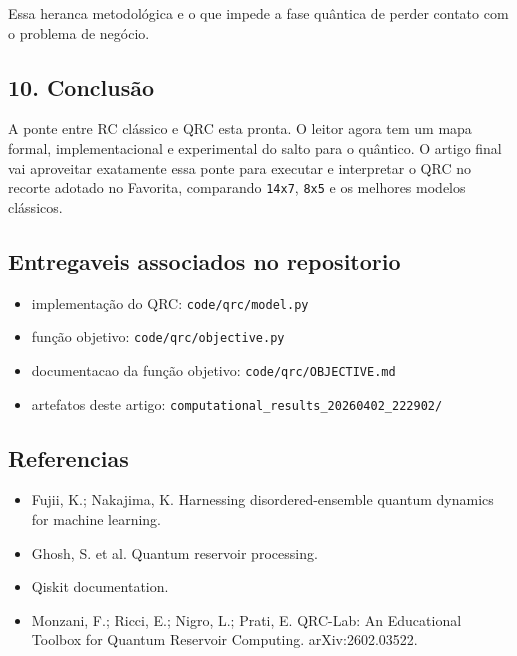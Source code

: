 \documentclass[12pt]{article}
\providecommand{\tightlist}{%
          \setlength{\itemsep}{0pt}\setlength{\parskip}{0pt}}
\begin{document}
Essa heranca metodológica e o que impede a fase quântica de perder contato com o problema de negócio.

\subsection{10. Conclusão}\label{10-conclusuxe3o}

A ponte entre RC clássico e QRC esta pronta. O leitor agora tem um mapa formal, implementacional e experimental do salto para o quântico. O artigo final vai aproveitar exatamente essa ponte para executar e interpretar o QRC no recorte adotado no Favorita, comparando \texttt{14x7}, \texttt{8x5} e os melhores modelos clássicos.

\subsection{Entregaveis associados no repositorio}\label{entregaveis-associados-no-repositorio}

\begin{itemize}
\tightlist
\item
  implementação do QRC: \texttt{code/qrc/model.py}
\item
  função objetivo: \texttt{code/qrc/objective.py}
\item
  documentacao da função objetivo: \texttt{code/qrc/OBJECTIVE.md}
\item
  artefatos deste artigo: \texttt{computational\_results\_20260402\_222902/}
\end{itemize}

\subsection{Referencias}\label{referencias}

\begin{itemize}
\tightlist
\item
  Fujii, K.; Nakajima, K. Harnessing disordered-ensemble quantum dynamics for machine learning.
\item
  Ghosh, S. et al. Quantum reservoir processing.
\item
  Qiskit documentation.
\item
  Monzani, F.; Ricci, E.; Nigro, L.; Prati, E. QRC-Lab: An Educational Toolbox for Quantum Reservoir Computing. arXiv:2602.03522.
\end{itemize}

        
\end{document}
